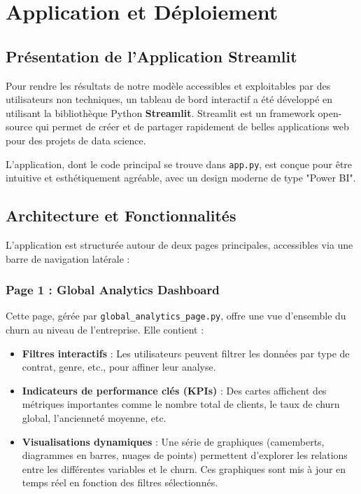 \chapter{Application et Déploiement}

\section{Présentation de l'Application Streamlit}
Pour rendre les résultats de notre modèle accessibles et exploitables par des utilisateurs non techniques, un tableau de bord interactif a été développé en utilisant la bibliothèque Python \textbf{Streamlit}. Streamlit est un framework open-source qui permet de créer et de partager rapidement de belles applications web pour des projets de data science.

L'application, dont le code principal se trouve dans \texttt{app.py}, est conçue pour être intuitive et esthétiquement agréable, avec un design moderne de type "Power BI".

\section{Architecture et Fonctionnalités}
L'application est structurée autour de deux pages principales, accessibles via une barre de navigation latérale :

\subsection{Page 1 : Global Analytics Dashboard}
Cette page, gérée par \texttt{global\_analytics\_page.py}, offre une vue d'ensemble du churn au niveau de l'entreprise. Elle contient :
\begin{itemize}
    \item \textbf{Filtres interactifs} : Les utilisateurs peuvent filtrer les données par type de contrat, genre, etc., pour affiner leur analyse.
    \item \textbf{Indicateurs de performance clés (KPIs)} : Des cartes affichent des métriques importantes comme le nombre total de clients, le taux de churn global, l'ancienneté moyenne, etc.
    \item \textbf{Visualisations dynamiques} : Une série de graphiques (camemberts, diagrammes en barres, nuages de points) permettent d'explorer les relations entre les différentes variables et le churn. Ces graphiques sont mis à jour en temps réel en fonction des filtres sélectionnés.
\end{itemize}

